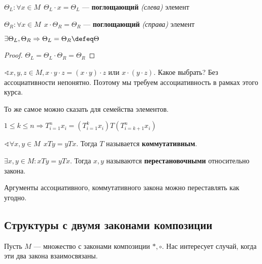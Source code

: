 \begin{definition}
    \(\Theta_L : \forall x \in M \ \ \Theta_L \cdot x = \Theta_L\) --- \textbf{поглощающий} \textit{(слева)} элемент

    \(\Theta_R : \forall x \in M \ \ x \cdot \Theta_R = \Theta_R\) --- \textbf{поглощающий} \textit{(справа)} элемент
\end{definition}

\begin{lemma}
    \(\exists \Theta_L, \Theta_R \Rightarrow \Theta_L = \Theta_R \defeq \Theta\)
\end{lemma}
\begin{proof}
    \(\Theta_L = \Theta_L \cdot \Theta_R = \Theta_R\)
\end{proof}

\(\sphericalangle x,y,z \in M, x \cdot y \cdot z = (x \cdot y) \cdot z\) или \(x \cdot (y \cdot z)\). Какое выбрать? Без ассоциативности непонятно. Поэтому мы требуем ассоциативность в рамках этого курса.

То же самое можно сказать для семейства элементов.

\begin{theorem}
    \(1 \leq k \leq n \Rightarrow T_{i = 1}^n x_i = \left( T_{i = 1}^k x_i \right) T \left( T_{i = k + 1}^n x_i \right)\)
\end{theorem}

\begin{definition}
    \(\sphericalangle \forall x, y \in M \ \ xTy = yTx\). Тогда \(T\) называется \textbf{коммутативным}.
\end{definition}

\begin{definition}
    \(\exists x, y \in M : xTy = yTx\). Тогда \(x, y\) называются \textbf{перестановочными} относительно закона.
\end{definition}

\begin{theorem}
    Аргументы ассоциативного, коммутативного закона можно переставлять как угодно.
\end{theorem}

\subsection{Структуры с двумя законами композиции}

Пусть \(M\) --- множество с законами композиции \(*, \circ\). Нас интересует случай, когда эти два закона взаимосвязаны.

